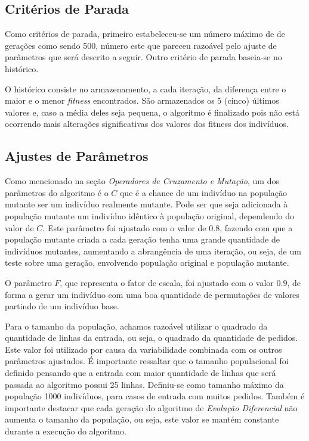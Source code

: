 \documentclass[12pt]{elsarticle}
\begin{document}
	\subsection{Critérios de Parada}
	Como critérios de parada, primeiro estabeleceu-se um número máximo de de gerações como sendo 500, número este que pareceu razoável pelo ajuste de parâmetros que será descrito a seguir. Outro critério de parada baseia-se no histórico.
	
	O histórico consiste no armazenamento, a cada iteração, da diferença entre o maior e o menor \emph{fitness} encontrados. São armazenados os 5 (cinco) últimos valores e, caso a média deles seja pequena, o algoritmo é finalizado pois não está ocorrendo mais alterações significativas dos valores dos fitness dos indivíduos.
	
	\subsection{Ajustes de Parâmetros}
	Como mencionado na seção \textit{Operadores de Cruzamento e Mutação}, um dos parâmetros do algoritmo é o $C$ que é a chance de um indivíduo na população mutante ser um indivíduo realmente mutante. Pode ser que seja adicionada à população mutante um indivíduo idêntico à população original, dependendo do valor de $C$. Este parâmetro foi ajustado com o valor de $0.8$, fazendo com que a população mutante criada a cada geração tenha uma grande quantidade de indivíduos mutantes, aumentando a abrangência de uma iteração, ou seja, de um teste sobre uma geração, envolvendo população original e população mutante.
	
	O parâmetro $F$, que representa o fator de escala, foi ajustado com o valor $0.9$, de forma a gerar um indivíduo com uma boa quantidade de permutações de valores partindo de um indivíduo base.
	
	Para o tamanho da população, achamos razoável utilizar o quadrado da quantidade de linhas da entrada, ou seja, o quadrado da quantidade de pedidos. Este valor foi utilizado por causa da variabilidade combinada com os outros parâmetros ajustados. É importante ressaltar que o tamanho populacional foi definido pensando que a entrada com maior quantidade de linhas que será passada ao algoritmo possui 25 linhas. Definiu-se como tamanho máximo da população 1000 indivíduos, para casos de entrada com muitos pedidos. Também é importante destacar que cada geração do algoritmo de \textit{Evolução Diferencial} não aumenta o tamanho da população, ou seja, este valor se mantém constante durante a execução do algoritmo.
	
\end{document}
